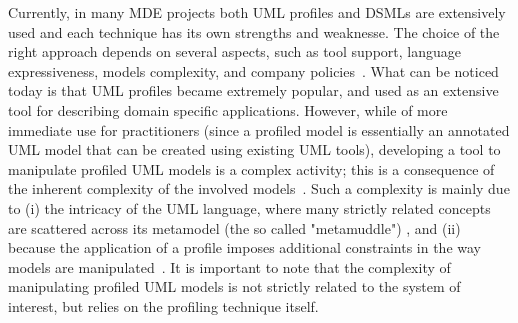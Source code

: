 Currently, in many MDE projects both UML profiles and DSMLs are extensively used and each technique has its own strengths and weaknesse.
The choice of the right approach depends on several aspects, such as tool support, language expressiveness,
models complexity, and company policies~\cite{comparison}.
What can be noticed today is that UML profiles became extremely popular, and used as an extensive tool for describing domain specific
applications.
However, while of more immediate use for practitioners (since a profiled model is essentially an annotated UML model that can be
created using existing UML tools), developing a tool to manipulate profiled UML models is a complex activity; this is a consequence
of the inherent complexity of the involved models~\cite{comparison}\cite{france}.
Such a complexity is mainly due to
(i) the intricacy of the UML language, where many strictly related concepts are scattered across its metamodel (the so called "metamuddle"\cite{france})
, and (ii) because the application of a profile imposes additional constraints in the way models are manipulated~\cite{UMLprofile}.
It is important to note that the complexity of manipulating profiled UML models is not strictly related to
the system of interest, but relies on the profiling technique itself.

